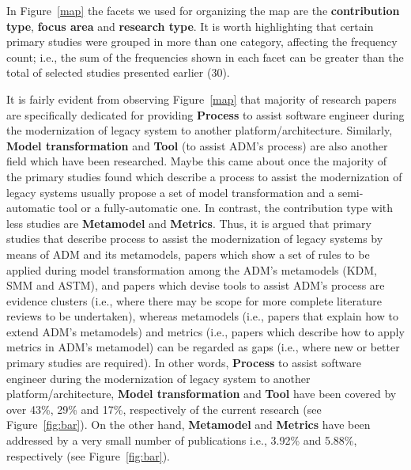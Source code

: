In Figure~\ref{map} the facets we used for organizing the map are the \textbf{contribution type}, \textbf{focus area} and \textbf{research type}. It is worth highlighting that certain primary studies were grouped in more than one category, affecting the frequency count; i.e., the sum of the frequencies shown in each facet can be greater than the total of selected studies presented earlier (30).

 It is fairly evident from observing Figure~\ref{map} that majority of research papers are specifically dedicated for providing \textbf{Process} to assist software engineer during the modernization of legacy system to another platform/architecture. Similarly, \textbf{Model transformation} and \textbf{Tool} (to assist ADM's process) are also another field which have been researched. Maybe this came about once the majority of the primary studies found which describe a process to assist the modernization of legacy systems usually propose a set of model transformation and a semi-automatic tool or a fully-automatic one. In contrast, the contribution type with less studies are \textbf{Metamodel} and \textbf{Metrics}. Thus, it is argued that primary studies that describe process to assist the modernization of legacy systems by means of ADM and its metamodels, papers which show a set of rules to be applied during model transformation among the ADM's metamodels (KDM, SMM and ASTM), and papers which devise tools to assist ADM's process are evidence clusters (i.e., where there may be scope for more complete literature reviews to be undertaken), whereas metamodels (i.e., papers that explain how to extend ADM's metamodels) and metrics (i.e., papers which describe how to apply metrics in ADM's metamodel) can be regarded as gaps (i.e., where new or better primary studies are required). In other words, \textbf{Process} to assist software engineer during the modernization of legacy system to another platform/architecture, \textbf{Model transformation} and \textbf{Tool} have been covered by over 43\%, 29\% and 17\%, respectively of the current research (see Figure~\ref{fig:bar}). On the other hand, \textbf{Metamodel} and \textbf{Metrics} have been addressed by a very small number of publications i.e., 3.92\% and 5.88\%, respectively (see Figure~\ref{fig:bar}).   %

% 
 
